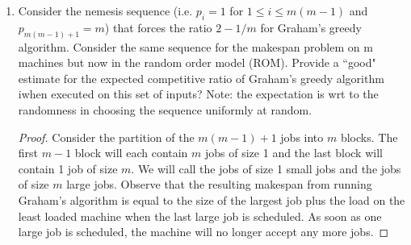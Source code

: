 \documentclass[11pt]{article}
\begin{document}
\begin{enumerate}[leftmargin=16pt]
\begin{enumerate}[leftmargin=16pt]
        \item Consider the nemesis sequence (i.e. $p_i = 1$ for $1 \leq i \leq m(m - 1)$ and $p_{m(m-1)+1} = m$) that forces the ratio $2-1/m$ for Graham's greedy algorithm. Consider the same sequence for the makespan problem on m machines but now in the random order model (ROM). Provide a ``good" estimate for the expected competitive ratio of Graham's greedy algorithm iwhen executed on this set of inputs? Note: the expectation is wrt to the randomness in choosing the sequence uniformly at random.
        
        \begin{proof}
            Consider the partition of the $m(m-1)+1$ jobs into $m$ blocks. The first $m-1$ block will each contain $m$ jobs of size 1 and the last block will contain 1 job of size $m$. We will call the jobs of size 1 small jobs and the jobs of size $m$ large jobs. Observe that the resulting makespan from running Graham's algorithm is equal to the size of the largest job plus the load on the least loaded machine when the last large job is scheduled. As soon as one large job is scheduled, the machine will no longer accept any more jobs.


\end{proof}
\end{enumerate}
\end{enumerate}
\end{document}
